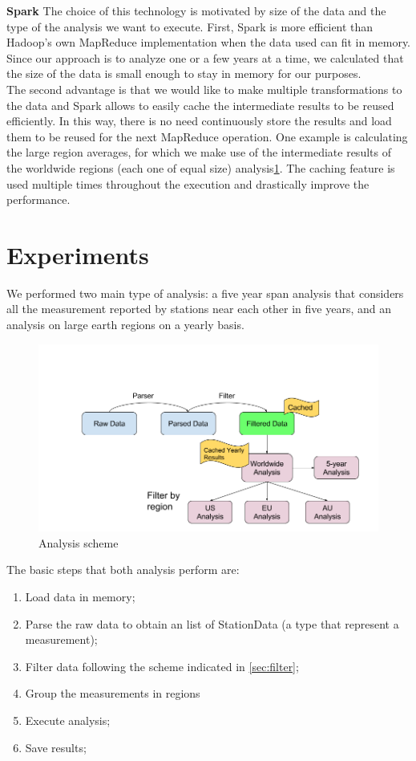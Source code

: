 \documentclass{vldb}
\begin{document}
\textbf{Spark}
The choice of this technology is motivated by size of the data and the type of the analysis we want to execute. First, Spark is more efficient than Hadoop's own MapReduce\cite{dean2008mapreduce} implementation when the data used can fit in memory. Since our approach is to analyze one or a few years at a time, we calculated that the size of the data is small enough to stay in memory for our purposes. \\
The second advantage is that we would like to make multiple transformations to the data and Spark allows to easily cache the intermediate results to be reused efficiently. In this way, there is no need continuously store the results and load them to be reused for the next MapReduce operation. One example is calculating the large region averages, for which we make use of the intermediate results of the worldwide regions (each one of equal size) analysis\ref{fig:analysis}. The caching feature is used multiple times throughout the execution and drastically improve the performance. \\


\section{Experiments}
\label{sec:exp}
We performed two main type of analysis: a five year span analysis that considers all the measurement reported by stations near each other in five years, and an analysis on large earth regions on a yearly basis. \\

\begin{figure}[tbh]
\includegraphics[width=1\linewidth]{analysis}
\caption{Analysis scheme}
\label{fig:analysis}
\end{figure}


The basic steps that both analysis perform are:
\begin{enumerate}
    \item Load data in memory;
    \item Parse the raw data to obtain an list of StationData (a type that represent a measurement);
    \item Filter data following the scheme indicated in \ref{sec:filter};
    \item Group the measurements in regions
    \item Execute analysis;
    \item Save results;
\end{enumerate}
\end{document}
